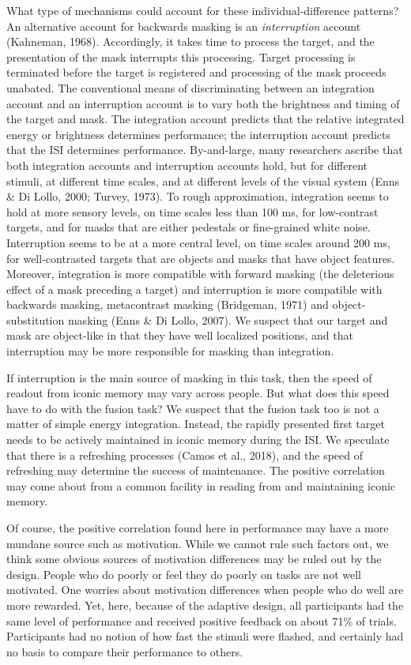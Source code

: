\documentclass[
  ,man]{apa6}
\begin{document}
What type of mechanisms could account for these individual-difference patterns? An alternative account for backwards masking is an \emph{interruption} account (Kahneman, 1968). Accordingly, it takes time to process the target, and the presentation of the mask interrupts this processing. Target processing is terminated before the target is registered and processing of the mask proceeds unabated. The conventional means of discriminating between an integration account and an interruption account is to vary both the brightness and timing of the target and mask. The integration account predicts that the relative integrated energy or brightness determines performance; the interruption account predicts that the ISI determines performance. By-and-large, many researchers ascribe that both integration accounts and interruption accounts hold, but for different stimuli, at different time scales, and at different levels of the visual system (Enns \& Di Lollo, 2000; Turvey, 1973). To rough approximation, integration seems to hold at more sensory levels, on time scales less than 100 ms, for low-contrast targets, and for masks that are either pedestals or fine-grained white noise. Interruption seems to be at a more central level, on time scales around 200 ms, for well-contrasted targets that are objects and masks that have object features. Moreover, integration is more compatible with forward masking (the deleterious effect of a mask preceding a target) and interruption is more compatible with backwards masking, metacontrast masking (Bridgeman, 1971) and object-substitution masking (Enns \& Di Lollo, 2007). We suspect that our target and mask are object-like in that they have well localized positions, and that interruption may be more responsible for masking than integration.

If interruption is the main source of masking in this task, then the speed of readout from iconic memory may vary across people. But what does this speed have to do with the fusion task? We suspect that the fusion task too is not a matter of simple energy integration. Instead, the rapidly presented first target needs to be actively maintained in iconic memory during the ISI. We speculate that there is a refreshing processes (Camos et al., 2018), and the speed of refreshing may determine the success of maintenance. The positive correlation may come about from a common facility in reading from and maintaining iconic memory.

Of course, the positive correlation found here in performance may have a more mundane source such as motivation. While we cannot rule such factors out, we think some obvious sources of motivation differences may be ruled out by the design. People who do poorly or feel they do poorly on tasks are not well motivated. One worries about motivation differences when people who do well are more rewarded. Yet, here, because of the adaptive design, all participants had the same level of performance and received positive feedback on about 71\% of trials. Participants had no notion of how fast the stimuli were flashed, and certainly had no basis to compare their performance to others.
\end{document}
